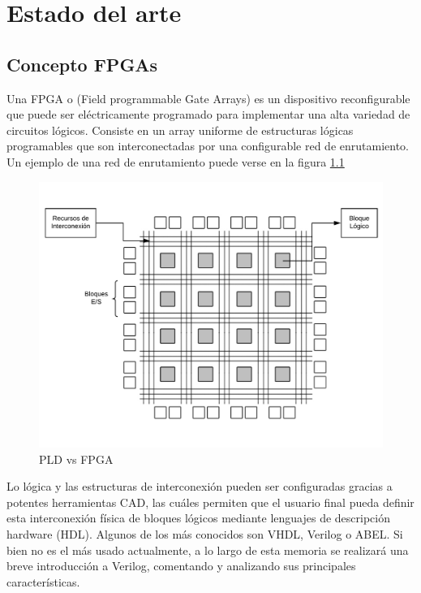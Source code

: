 \chapter{Estado del arte}
\section{Concepto FPGAs}
Una FPGA o (Field programmable Gate Arrays) es un dispositivo reconfigurable que puede ser eléctricamente programado para implementar una alta variedad de circuitos lógicos. Consiste en un array uniforme de estructuras lógicas programables que son interconectadas por una configurable red de enrutamiento. Un ejemplo de una red de enrutamiento puede verse en la figura \ref{fig:estructura_FPGA}

\begin{center}
	\begin{figure}[H]
		\center
		\includegraphics[trim = 0mm 10mm 0mm 10mm, clip,scale=0.4]{imagenes/EstadoArte/estructura_FPGA.pdf}
		\caption{PLD vs FPGA}
		\label{fig:estructura_FPGA}
	\end{figure}
\end{center}
 

Lo lógica y las estructuras de interconexión pueden ser configuradas gracias a potentes herramientas CAD, las cuáles permiten que el usuario final pueda definir esta interconexión física de bloques lógicos mediante lenguajes de descripción hardware (HDL). Algunos de los más conocidos son VHDL, Verilog o ABEL. 
\newline
Si bien no es el más usado actualmente, a lo largo de esta memoria se realizará una breve introducción a Verilog, comentando y analizando sus principales características.
\newpage
